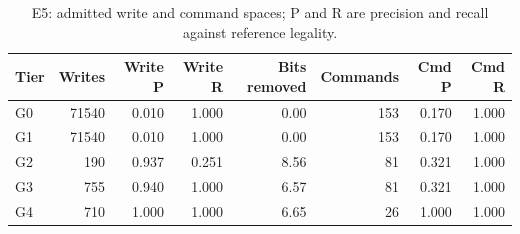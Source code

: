 \begin{table}[t]
\centering\footnotesize
\caption{E5: admitted write and command spaces; P and R are precision and recall against reference legality.}
\label{tab:archive-actions}
\setlength{\tabcolsep}{3.5pt}
\begin{tabular}{@{}lrrrrrrr@{}}
\toprule
Tier & Writes & Write P & Write R & Bits removed & Commands & Cmd P & Cmd R \\
\midrule
G0 & 71540 & 0.010 & 1.000 & 0.00 & 153 & 0.170 & 1.000 \\
G1 & 71540 & 0.010 & 1.000 & 0.00 & 153 & 0.170 & 1.000 \\
G2 & 190 & 0.937 & 0.251 & 8.56 & 81 & 0.321 & 1.000 \\
G3 & 755 & 0.940 & 1.000 & 6.57 & 81 & 0.321 & 1.000 \\
G4 & 710 & 1.000 & 1.000 & 6.65 & 26 & 1.000 & 1.000 \\
\bottomrule
\end{tabular}
\end{table}
